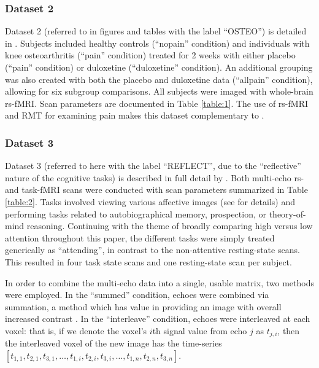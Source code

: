 \documentclass[12pt]{spieman}  %
\begin{document}
\begin{spacing}{2}
\subsubsection{Dataset 2}
Dataset 2 (referred to in figures and tables with the label ``OSTEO'') is detailed in
\cite{tetreaultBrainConnectivityPredicts2016}. Subjects included healthy controls (``nopain''
condition) and individuals with knee osteoarthritis (``pain'' condition) treated for 2 weeks with
either placebo (``pain'' condition) or duloxetine (``duloxetine'' condition). An additional grouping was
also created with both the placebo and duloxetine data (``allpain'' condition), allowing for six
subgroup comparisons. All subjects were imaged with whole-brain rs-fMRI. Scan parameters are
documented in Table \ref{table:1}. The use of rs-fMRI and RMT for examining pain makes this dataset
complementary to \cite{matharooSpontaneousBackpainAlters2020}.

\subsubsection{Dataset 3}
Dataset 3  (referred to here with the label ``REFLECT'', due to the ``reflective” nature of the
cognitive tasks) is described in full detail by \cite{dupreMultiechoFMRIReplication2016}. Both
multi-echo rs- and task-fMRI scans were conducted with scan parameters summarized in Table \ref{table:2}. Tasks
involved viewing various affective images (see \cite{sprengPatternsBrainActivity2010} for details)
and performing tasks related to autobiographical memory, prospection, or theory-of-mind reasoning.
Continuing with the theme of broadly comparing high versus low attention throughout this paper, the
different tasks were simply treated generically as ``attending'', in contrast to the non-attentive
resting-state scans. This resulted in four task state scans and one resting-state scan per subject.

In order to combine the multi-echo data into a single, usable matrix, two methods were employed. In
the ``summed'' condition, echoes were combined via summation, a method which has value in providing an
image with overall increased contrast \cite{kunduMultiechoFMRIReview2017}. In the ``interleave''
condition, echoes were interleaved at each voxel: that is, if we denote the voxel's \(i\)th signal value
from echo \(j\) as \(t_{j,i}\), then the interleaved voxel of the new image has the time-series \([t_{1,1},
t_{2,1}, t_{3,1}, \dots, t_{1,i}, t_{2,i}, t_{3,i}, \dots, t_{1,n}, t_{2,n}, t_{3,n}]\).


\end{spacing}
\end{document}
